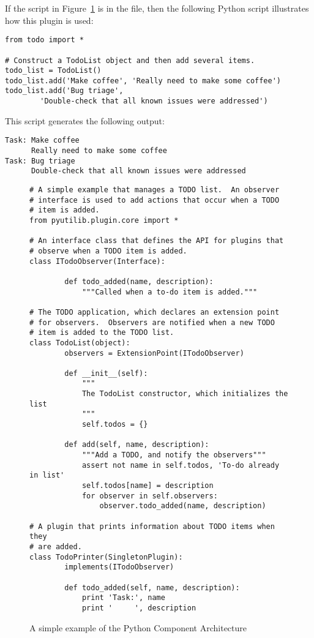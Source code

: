 If the script in Figure~\ref{fig:example1} 
is in the  file, then the following Python script 
illustrates how this plugin is used:
\begin{lstlisting}
from todo import *

# Construct a TodoList object and then add several items.
todo_list = TodoList()
todo_list.add('Make coffee', 'Really need to make some coffee')
todo_list.add('Bug triage',
        'Double-check that all known issues were addressed')
\end{lstlisting}
This script generates the following output:
\begin{lstlisting}
Task: Make coffee
      Really need to make some coffee
Task: Bug triage
      Double-check that all known issues were addressed
\end{lstlisting}


\begin{figure}

\begin{lstlisting}
# A simple example that manages a TODO list.  An observer 
# interface is used to add actions that occur when a TODO 
# item is added.
from pyutilib.plugin.core import *

# An interface class that defines the API for plugins that
# observe when a TODO item is added.
class ITodoObserver(Interface):

        def todo_added(name, description):
            """Called when a to-do item is added."""

# The TODO application, which declares an extension point
# for observers.  Observers are notified when a new TODO
# item is added to the TODO list.
class TodoList(object):
        observers = ExtensionPoint(ITodoObserver)

        def __init__(self):
            """
            The TodoList constructor, which initializes the list
            """
            self.todos = {}

        def add(self, name, description):
            """Add a TODO, and notify the observers"""
            assert not name in self.todos, 'To-do already in list'
            self.todos[name] = description
            for observer in self.observers:
                observer.todo_added(name, description)

# A plugin that prints information about TODO items when they
# are added.
class TodoPrinter(SingletonPlugin):
        implements(ITodoObserver)

        def todo_added(self, name, description):
            print 'Task:', name
            print '     ', description
\end{lstlisting}

\caption{\label{fig:example1} A simple example of the Python Component Architecture}
\end{figure}


